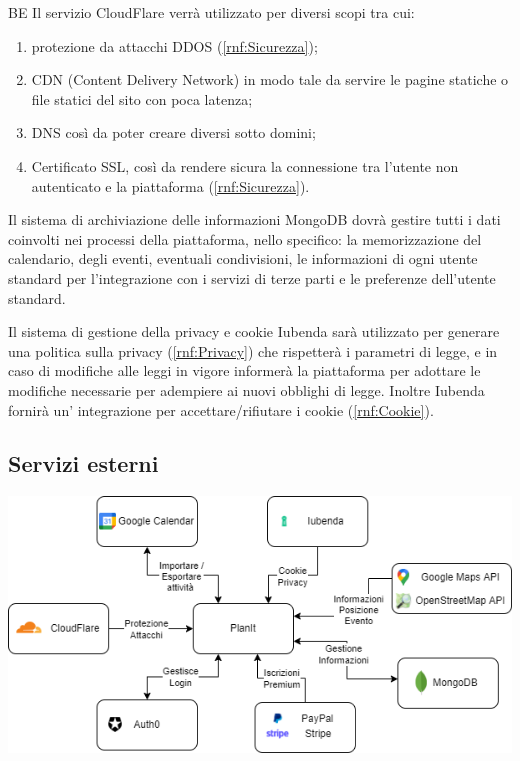 \begin{listaPersonale}{BE}
     Il servizio CloudFlare verrà utilizzato per diversi scopi tra cui:
    \begin{enumerate}
        \item protezione da attacchi DDOS (\ref{rnf:Sicurezza});
        \item CDN (Content Delivery Network) in modo tale da servire le pagine statiche o file statici del sito con poca latenza;
        \item DNS così da poter creare diversi sotto domini;
        \item Certificato SSL, così da rendere sicura la connessione tra l'utente non autenticato e la piattaforma (\ref{rnf:Sicurezza}).
    \end{enumerate}

     Il sistema di archiviazione delle informazioni MongoDB dovrà gestire tutti i dati coinvolti nei processi della piattaforma, nello specifico: la memorizzazione del calendario, degli eventi, eventuali condivisioni, le informazioni di ogni utente standard per l'integrazione con i servizi di terze parti e le preferenze dell'utente standard.

     Il sistema di gestione della privacy e cookie Iubenda sarà utilizzato per generare una politica sulla privacy (\ref{rnf:Privacy}) che rispetterà i parametri di legge, e in caso di modifiche alle leggi in vigore informerà la piattaforma per adottare le modifiche necessarie per adempiere ai nuovi obblighi di legge. Inoltre Iubenda fornirà un' integrazione per accettare/rifiutare i cookie (\ref{rnf:Cookie}).

\end{listaPersonale}

\subsection*{Servizi esterni}
\begin{center}
    \includegraphics[width=1\textwidth]{img/Servizi/ServiziEsterni.drawio.png}
\end{center}